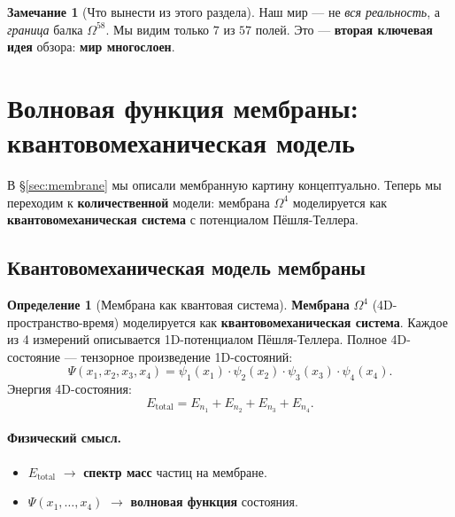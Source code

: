 \documentclass[11pt,a4paper]{article}
\newcommand{\Om}{\Omega^4}
\newcommand{\Omfi}{\Omega^{58}}
\theoremstyle{definition}
\newtheorem{definition}[theorem]{Определение}
\newtheorem{remark}[theorem]{Замечание}
\begin{document}
\begin{remark}[Что вынести из этого раздела]
\label{rem:membrane-takeaway}
Наш мир — не \emph{вся реальность}, а \emph{граница} балка $\Omfi$. 
Мы видим только $7$ из $57$ полей. Это — \textbf{вторая ключевая 
идея} обзора: \textbf{мир многослоен}.
\end{remark}
\section{Волновая функция мембраны: квантовомеханическая модель}
\label{sec:membrane-wave-review}

В §\ref{sec:membrane} мы описали мембранную картину концептуально. 
Теперь мы переходим к \textbf{количественной} модели: мембрана 
$\Om$ моделируется как \textbf{квантовомеханическая система} 
с потенциалом Пёшля-Теллера.

\subsection{Квантовомеханическая модель мембраны}

\begin{definition}[Мембрана как квантовая система]
\label{def:membrane-quantum-review}
\textbf{Мембрана} $\Om$ (4D-пространство-время) моделируется 
как \textbf{квантовомеханическая система}. Каждое из 4 измерений 
описывается 1D-потенциалом Пёшля-Теллера. Полное 4D-состояние — 
тензорное произведение 1D-состояний:
\begin{equation}
    \boxed{
    \Psi(x_1, x_2, x_3, x_4) = 
    \psi_1(x_1) \cdot \psi_2(x_2) \cdot \psi_3(x_3) \cdot \psi_4(x_4).
    }
    \label{eq:membrane-psi-review}
\end{equation}
Энергия 4D-состояния:
\begin{equation}
    \boxed{
    E_{\text{total}} = E_{n_1} + E_{n_2} + E_{n_3} + E_{n_4}.
    }
    \label{eq:membrane-E-review}
\end{equation}
\end{definition}

\paragraph{Физический смысл.}
\begin{itemize}
    \item $E_{\text{total}}$ $\to$ \textbf{спектр масс} частиц 
          на мембране.
    \item $\Psi(x_1, \ldots, x_4)$ $\to$ \textbf{волновая функция} 
          состояния.
\end{itemize}
\end{document}
